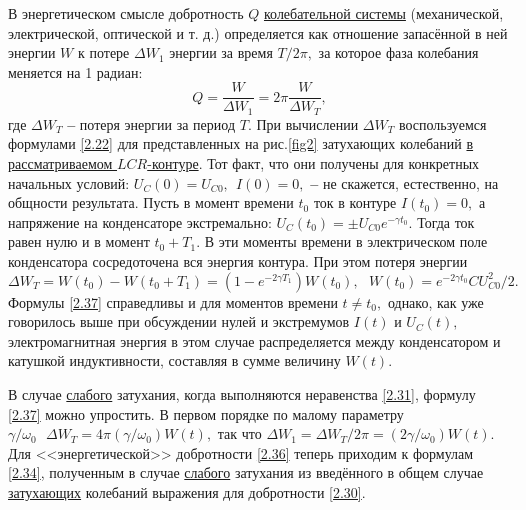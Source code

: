 В энергетическом смысле добротность $Q$ \underline{колебательной системы} (механической, электриче\-ской, оптической и т. д.) определяется как отношение запасённой в ней энергии $W$ к потере $\Delta W_1$ энергии за время $T/2\pi,$ за которое фаза колебания меняется на 1 радиан:
\begin{equation}\label{2.36}
Q=\dfrac{W}{\Delta W_1}=2\pi\dfrac{W}{\Delta W_T},
\end{equation}
где  $\Delta W_T$ \textbf{--} потеря энергии за период $T.$ При вычислении $\Delta W_T$ воспользуемся формулами \eqref{2.22} для представленных на рис.\ref{fig2} затухающих колебаний \underline{в рас\-сма\-три\-ва\-емом $LCR$-контуре}. Тот факт, что они получены для конкретных начальных условий: $U_C(0)=U_{C0},~~ I(0)=0,$ \textbf{--} не ска\-жется, естественно, на общности результата. Пусть в момент времени $t_0$ ток в контуре $I(t_0)=0,$ а напряжение на конденсаторе экстремально: $U_C(t_0)=\pm U_{C0}e^{-\gamma t_0}.$ Тогда ток равен нулю и в момент $t_0+T_1.$ В эти моменты времени в электрическом поле конденсатора сосредо\-точена вся энергия контура. При этом потеря энергии
\begin{equation}\label{2.37}
\Delta W_T=W(t_0)-W(t_0+T_1)=(1-e^{-2\gamma T_1})W(t_0),~~~
W(t_0)=e^{-2\gamma t_0}CU_{C0}^2/2.
\end{equation}
Формулы \eqref{2.37} справедливы и для моментов времени $t\ne t_0,$ однако, как уже говорилось выше при обсуждении нулей и экстремумов $I(t)$ и $U_C(t),$ электромагнитная энергия в этом случае распределяется между конденсатором и катушкой индуктивности, составляя в сумме величину $W(t).$

В случае \underline{слабого} затухания, когда выполняются неравенства \eqref{2.31}, формулу \eqref{2.37} можно упростить. В первом порядке по малому параметру $\gamma/\omega_0~~~\Delta W_T=4\pi(\gamma/\omega_0)W(t),$ так что $\Delta W_1=\Delta W_T/2\pi=(2\gamma/\omega_0)W(t).$ Для <<энергетической>> добротности \eqref{2.36} теперь приходим к формулам \eqref{2.34}, полученным в случае \underline{слабого} затухания из введённого в общем случае \underline{зату\-хающих} колебаний выражения для добротности \eqref{2.30}.

